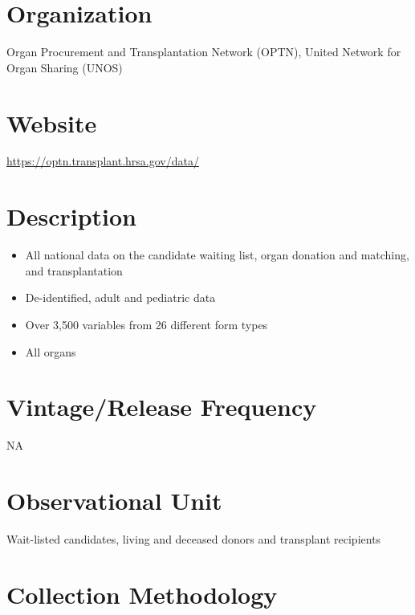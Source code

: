 \documentclass[
]{book}
\providecommand{\tightlist}{%
  \setlength{\itemsep}{0pt}\setlength{\parskip}{0pt}}
\begin{document}
\hypertarget{organization-90}{%
\section{Organization}\label{organization-90}}

Organ Procurement and Transplantation Network (OPTN), United Network for Organ Sharing (UNOS)

\hypertarget{website-90}{%
\section{Website}\label{website-90}}

\url{https://optn.transplant.hrsa.gov/data/}

\hypertarget{description-90}{%
\section{Description}\label{description-90}}

\begin{itemize}
\tightlist
\item
  All national data on the candidate waiting list, organ donation and matching, and transplantation
\item
  De-identified, adult and pediatric data
\item
  Over 3,500 variables from 26 different form types
\item
  All organs
\end{itemize}

\hypertarget{vintagerelease-frequency-90}{%
\section{Vintage/Release Frequency}\label{vintagerelease-frequency-90}}

NA

\hypertarget{observational-unit-90}{%
\section{Observational Unit}\label{observational-unit-90}}

Wait-listed candidates, living and deceased donors and transplant recipients

\hypertarget{collection-methodology-90}{%
\section{Collection Methodology}\label{collection-methodology-90}}
\end{document}
